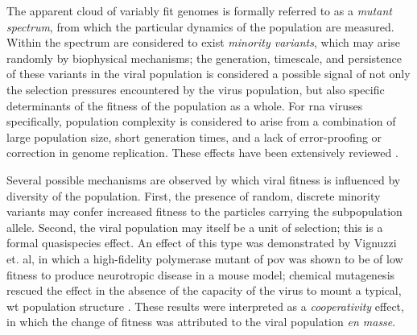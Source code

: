The apparent cloud of variably fit genomes is formally referred to as a \emph{mutant spectrum}, from which the particular dynamics of the population are measured. Within the spectrum are considered to exist \emph{minority variants}, which may arise randomly by biophysical mechanisms; the generation, timescale, and persistence of these variants in the viral population is considered a possible signal of not only the selection pressures encountered by the virus population, but also specific determinants of the fitness of the population as a whole. For \gls{rna} viruses specifically, population complexity is considered to arise from a combination of large population size, short generation times, and a lack of error-proofing or correction in genome replication. These effects have been extensively reviewed \parencite{Andino:2015bg, Domingo:2012hw}.

Several possible mechanisms are observed by which viral fitness is influenced by diversity of the population. First, the presence of random, discrete minority variants may confer increased fitness to the particles carrying the subpopulation allele. Second, the viral population may itself be a unit of selection; this is a formal quasispecies effect. An effect of this type was demonstrated by Vignuzzi et. al, in which a high-fidelity polymerase mutant of \gls{pov} was shown to be of low fitness to produce neurotropic disease in a mouse model; chemical mutagenesis rescued the effect in the absence of the capacity of the virus to mount a typical, \gls{wt} population structure \parencite{Vignuzzi:2006ju}. These results were interpreted as a \emph{cooperativity} effect, in which the change of fitness was attributed to the viral population \emph{en masse}. 

